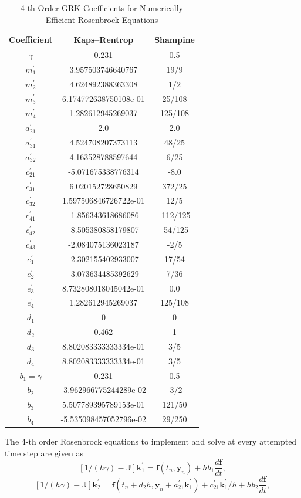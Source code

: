 \documentclass{ansconf}
\numberwithin{equation}{section}
\begin{document}
\begin{table}
\caption{4-th Order GRK Coefficients for Numerically Efficient Rosenbrock Equations}
\label{tab:ef_coefs}
\centering
\begin{tabular}{ccc}
\toprule
Coefficient & Kaps--Rentrop & Shampine \tabularnewline
\midrule
\midrule
$\gamma$ & 0.231 & 0.5 \tabularnewline
\midrule
$m^\prime_1$ &  3.957503746640767 & 19/9 \tabularnewline
\midrule
$m^\prime_2$ &  4.624892388363308 & 1/2 \tabularnewline
\midrule
$m^\prime_3$ & 6.174772638750108e-01 & 25/108 \tabularnewline
\midrule
$m^\prime_4$ &  1.282612945269037 & 125/108 \tabularnewline
\midrule
$a^\prime_{21}$ & 2.0 & 2.0 \tabularnewline
\midrule
$a^\prime_{31}$ & 4.524708207373113 & 48/25 \tabularnewline
\midrule
$a^\prime_{32}$ & 4.163528788597644  & 6/25 \tabularnewline
\midrule
$c^\prime_{21}$ & -5.071675338776314 & -8.0 \tabularnewline
\midrule
$c^\prime_{31}$ & 6.020152728650829 & 372/25 \tabularnewline
\midrule
$c^\prime_{32}$ & 1.597506846726722e-01 & 12/5  \tabularnewline
\midrule
$c^\prime_{41}$ & -1.856343618686086 & -112/125 \tabularnewline
\midrule
$c^\prime_{42}$ & -8.505380858179807 & -54/125 \tabularnewline
\midrule
$c^\prime_{43}$ & -2.084075136023187 & -2/5 \tabularnewline
\midrule
$e^\prime_1$ & -2.302155402933007 & 17/54 \tabularnewline
\midrule
$e^\prime_2$ & -3.073634485392629 & 7/36 \tabularnewline
\midrule
$e^\prime_3$ & 8.732808018045042e-01 & 0.0 \tabularnewline
\midrule
$e^\prime_4$ & 1.282612945269037 & 125/108 \tabularnewline
\midrule
$d_1$ & 0 & 0 \tabularnewline
\midrule
$d_2$ & 0.462 & 1 \tabularnewline
\midrule
$d_3$ & 8.802083333333334e-01 & 3/5 \tabularnewline
\midrule
$d_4$ & 8.802083333333334e-01 & 3/5  \tabularnewline
\midrule
$b_1 = \gamma$ & 0.231 & 0.5 \tabularnewline
\midrule
$b_2$ & -3.962966775244289e-02 & -3/2 \tabularnewline
\midrule
$b_3$ & 5.507789395789153e-01 & 121/50 \tabularnewline
\midrule
$b_4$ & -5.535098457052796e-02 & 29/250 \tabularnewline
\bottomrule
\end{tabular}
\end{table}
The 4-th order Rosenbrock equations to implement and solve at every attempted time step are given as
\begin{equation}
\left[1/\left(h\gamma\right) - \mathbb{J}\right]\mathbf{k}^\prime_1 = \mathbf{f}\left(t_n, \mathbf{y}_n\right) + hb_1\frac{d\mathbf{f}}{dt},
\end{equation}
\begin{equation}
    \left[1/\left(h\gamma\right) - \mathbb{J}\right]\mathbf{k}^\prime_2 = \mathbf{f}\left(t_n + d_2h, \mathbf{y}_n + a^\prime_{21}\mathbf{k}^\prime_1\right) + c^\prime_{21}\mathbf{k}^\prime_1/h + hb_2\frac{d\mathbf{f}}{dt},
\end{equation}
\end{document}
